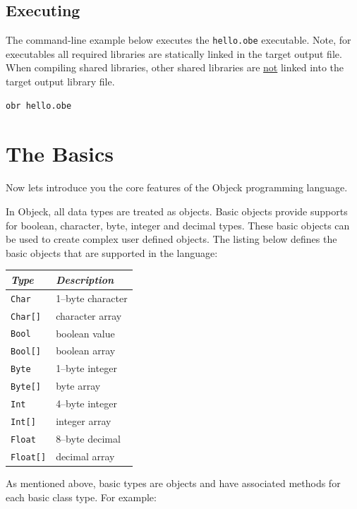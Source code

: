 \documentclass[12pt]{article}
\begin{document}
\subsection{Executing}
The command-line example below executes the \texttt{hello.obe} executable. Note, for executables all required libraries are statically linked in the target output file.  When compiling shared libraries, other shared libraries are \underline{not} linked into the target output library file.

\begin{verbatim}
obr hello.obe
\end{verbatim}

\section{The Basics}
Now lets introduce you the core features of the Objeck programming language.
\vspace{\baselineskip}

In Objeck, all data types are treated as objects. Basic objects provide supports for boolean, character, byte, integer and decimal types.  These basic objects can be used to create complex user defined objects.  The listing below defines the basic objects that are supported in the language:

\begin{center}
\begin{tabular}{| l | l |}
\hline
\emph{Type} & \emph{Description} \\ \hline \hline
\texttt{Char} &  1--byte character \\ \hline
\texttt{Char[]} &  character array \\ \hline
\texttt{Bool} &  boolean value \\ \hline
\texttt{Bool[]} &  boolean array \\ \hline
\texttt{Byte} &  1--byte integer \\ \hline
\texttt{Byte[]} &  byte array \\ \hline
\texttt{Int} &  4--byte integer \\ \hline
\texttt{Int[]} &  integer array \\ \hline
\texttt{Float} &  8--byte decimal \\ \hline
\texttt{Float[]} &  decimal array \\ \hline
\end{tabular}
\end{center}

As mentioned above, basic types are objects and have associated methods for each basic class type.  For example:
\end{document}
